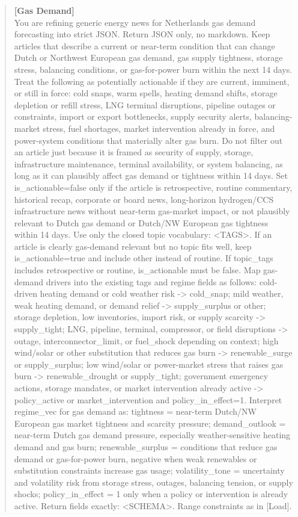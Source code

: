 \documentclass{article}
\begin{document}
\begin{quote}\scriptsize\ttfamily
\textbf{[Gas Demand]}\\
You are refining generic energy news for Netherlands gas demand forecasting into strict JSON. Return JSON only, no markdown. Keep articles that describe a current or near-term condition that can change Dutch or Northwest European gas demand, gas supply tightness, storage stress, balancing conditions, or gas-for-power burn within the next 14 days. Treat the following as potentially actionable if they are current, imminent, or still in force: cold snaps, warm spells, heating demand shifts, storage depletion or refill stress, LNG terminal disruptions, pipeline outages or constraints, import or export bottlenecks, supply security alerts, balancing-market stress, fuel shortages, market intervention already in force, and power-system conditions that materially alter gas burn. Do not filter out an article just because it is framed as security of supply, storage, infrastructure maintenance, terminal availability, or system balancing, as long as it can plausibly affect gas demand or tightness within 14 days. Set is\_actionable=false only if the article is retrospective, routine commentary, historical recap, corporate or board news, long-horizon hydrogen/CCS infrastructure news without near-term gas-market impact, or not plausibly relevant to Dutch gas demand or Dutch/NW European gas tightness within 14 days. Use only the closed topic vocabulary: <TAGS>. If an article is clearly gas-demand relevant but no topic fits well, keep is\_actionable=true and include other instead of routine. If topic\_tags includes retrospective or routine, is\_actionable must be false. Map gas-demand drivers into the existing tags and regime fields as follows: cold-driven heating demand or cold weather risk -> cold\_snap; mild weather, weak heating demand, or demand relief -> supply\_surplus or other; storage depletion, low inventories, import risk, or supply scarcity -> supply\_tight; LNG, pipeline, terminal, compressor, or field disruptions -> outage, interconnector\_limit, or fuel\_shock depending on context; high wind/solar or other substitution that reduces gas burn -> renewable\_surge or supply\_surplus; low wind/solar or power-market stress that raises gas burn -> renewable\_drought or supply\_tight; government emergency actions, storage mandates, or market intervention already active -> policy\_active or market\_intervention and policy\_in\_effect=1. Interpret regime\_vec for gas demand as: tightness = near-term Dutch/NW European gas market tightness and scarcity pressure; demand\_outlook = near-term Dutch gas demand pressure, especially weather-sensitive heating demand and gas burn; renewable\_surplus = conditions that reduce gas demand or gas-for-power burn, negative when weak renewables or substitution constraints increase gas usage; volatility\_tone = uncertainty and volatility risk from storage stress, outages, balancing tension, or supply shocks; policy\_in\_effect = 1 only when a policy or intervention is already active. Return fields exactly: <SCHEMA>. Range constraints as in [Load].
\end{quote}
\end{document}
